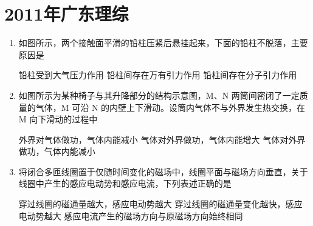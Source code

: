 \documentclass[\gkver]{gaokaozhenti}
\begin{document}
\chapter{2011年广东理综}

\begin{enumerate}
\item
如图所示，两个接触面平滑的铅柱压紧后悬挂起来，下面的铅柱不脱落，主要原因是


{铅柱受到大气压力作用}
{铅柱间存在万有引力作用}
{铅柱间存在分子引力作用}


\item
如图所示为某种椅子与其升降部分的结构示意图，M、N 两筒间密闭了一定质量的气体，M 可沿 N 的内壁上下滑动。设筒内气体不与外界发生热交换，在 M 向下滑动的过程中


{外界对气体做功，气体内能减小}
{气体对外界做功，气体内能增大}
{气体对外界做功，气体内能减小}


\item
将闭合多匝线圈置于仅随时间变化的磁场中，线圈平面与磁场方向垂直，关于线圈中产生的感应电动势和感应电流，下列表述正确的是

{穿过线圈的磁通量越大，感应电动势越大}
{穿过线圈的磁通量变化越快，感应电动势越大}
{感应电流产生的磁场方向与原磁场方向始终相同}


\end{enumerate}
\end{document}
